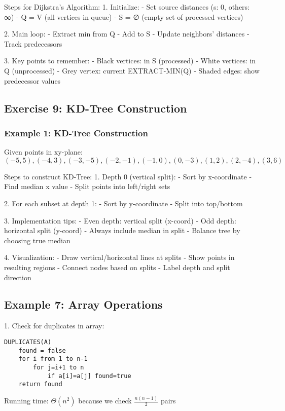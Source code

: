 Steps for Dijkstra's Algorithm:
1. Initialize:
   - Set source distances (s: 0, others: ∞)
   - Q = V (all vertices in queue)
   - S = ∅ (empty set of processed vertices)

2. Main loop:
   - Extract min from Q
   - Add to S
   - Update neighbors' distances
   - Track predecessors

3. Key points to remember:
   - Black vertices: in S (processed)
   - White vertices: in Q (unprocessed)
   - Grey vertex: current EXTRACT-MIN(Q)
   - Shaded edges: show predecessor values

\subsection*{Exercise 9: KD-Tree Construction}

\subsubsection*{Example 1: KD-Tree Construction}

Given points in xy-plane: $(-5,5), (-4,3), (-3,-5), (-2,-1), (-1,0), (0,-3), (1,2), (2,-4), (3,6)$

Steps to construct KD-Tree:
1. Depth 0 (vertical split):
   - Sort by x-coordinate
   - Find median x value
   - Split points into left/right sets

2. For each subset at depth 1:
   - Sort by y-coordinate
   - Split into top/bottom

3. Implementation tips:
   - Even depth: vertical split (x-coord)
   - Odd depth: horizontal split (y-coord)
   - Always include median in split
   - Balance tree by choosing true median

4. Visualization:
   - Draw vertical/horizontal lines at splits
   - Show points in resulting regions
   - Connect nodes based on splits
   - Label depth and split direction

\subsection*{Example 7: Array Operations}

1. Check for duplicates in array:
\begin{verbatim}
DUPLICATES(A)
    found = false
    for i from 1 to n-1
        for j=i+1 to n
            if a[i]=a[j] found=true
    return found
\end{verbatim}
Running time: $\Theta(n^2)$ because we check $\frac{n(n-1)}{2}$ pairs

